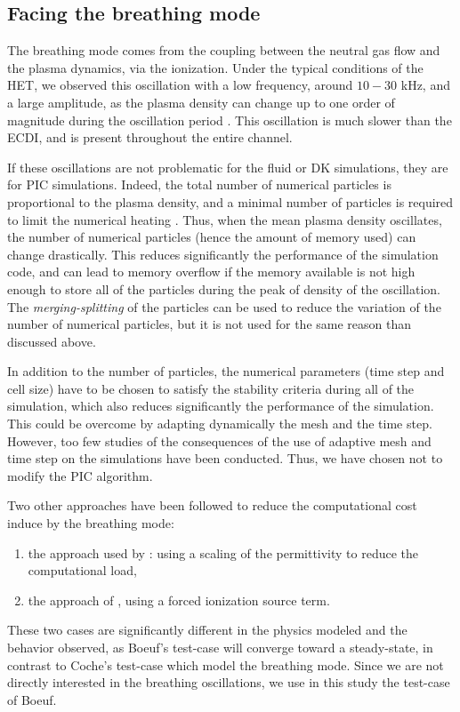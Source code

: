 \subsection{Facing the breathing mode} \label{subsec-breathmod}
The breathing mode comes from the coupling between the neutral gas flow and the plasma dynamics, via the ionization.
Under the typical conditions of the \ac{HET}, we observed this oscillation with a low frequency, around  $10-30$ kHz, and a large amplitude, as the plasma density can change up to one order of magnitude during the oscillation period \citep{barral2003a,barral2009}.
This oscillation is much slower than the \ac{ECDI}, and is present throughout the entire channel.

If these oscillations are not problematic for the fluid or \ac{DK} simulations, they are for \ac{PIC} simulations.
Indeed, the total number of numerical particles is proportional to the plasma density, and a minimal number of particles is required to limit the numerical heating \citep{turner2006}.
Thus, when the mean plasma density oscillates, the number of numerical particles (hence the amount of memory used) can change drastically.
This reduces significantly the performance of the simulation code, and can lead to memory overflow if the memory available is not high enough to store all of the particles during the peak of density  of the oscillation.
The \emph{merging-splitting} of the particles  can be used to reduce the variation of the number of numerical particles, but it is not used for the same reason than discussed above.

In addition to the number of particles, the numerical parameters (time step and cell size) have to be chosen to satisfy the stability criteria during all of the simulation, which also reduces significantly the performance of the simulation. 
This could be overcome by adapting dynamically the mesh and the time step.
However, too few studies of the consequences of the use of adaptive mesh and time step on the simulations have been conducted.
Thus, we have chosen not to modify the \ac{PIC} algorithm.

Two other approaches have been followed to reduce the computational cost induce by the breathing mode\string:
\begin{enumerate}
  \item the approach used by \citet{coche2014}\string: using a scaling of the permittivity to reduce the computational load,
  \item the approach of \citet{boeuf2017}, using a forced ionization source term.
\end{enumerate} 
These two cases are significantly different in the physics modeled and the behavior observed, as Boeuf's test-case will converge toward a steady-state, in contrast to Coche's test-case which model the breathing mode.
Since we are not directly interested in the breathing oscillations, we use in this study the test-case of Boeuf.

